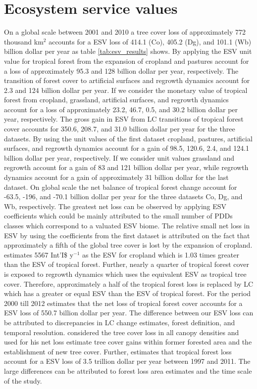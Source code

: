 	\section{Ecosystem service values}
		On a global scale between 2001 and 2010 a tree cover loss of approximately 772 thousand km$^2$ accounts for a \ac{ESV} loss of 414.1 (Co), 405.2 (Dg), and 101.1 (Wb) billion dollar per year as table \ref{tab:esv_results} shows. By applying the \ac{ESV} unit value for tropical forest from \citet{Costanza2014} the expansion of cropland and pastures account for a loss of approximately 95.3 and 128 billion dollar per year, respectively. The transition of forest cover to artificial surfaces and regrowth dynamics account for 2.3 and 124 billion dollar per year. If we consider the monetary value of tropical forest from \citet{Siikamaki2015} cropland, grassland, artificial surfaces, and regrowth dynamics account for a loss of approximately 23.2, 46.7, 0.5, and 30.2 billion dollar per year, respectively. The gross gain in \ac{ESV} from \ac{LC} transitions of tropical forest cover accounts for 350.6, 208.7, and 31.0 billion dollar per year for the three datasets. By using the unit values of the first dataset cropland, pastures, artificial surfaces, and regrowth dynamics account for a gain of 98.5, 120.6, 2.4, and 124.1 billion dollar per year, respectively. If we consider \citet{Groot2012} unit values grassland and regrowth account for a gain of 83 and 121 billion dollar per year, while regrowth dynamics account for a gain of approximately 31 billion dollar for the last dataset. On global scale the net balance of tropical forest change account for -63.5, -196, and -70.1 billion dollar per year for the three datasets Co, Dg, and Wb, respectively. The greatest net loss can be observed by applying \citet{Groot2012} \ac{ESV} coefficients which could be mainly attributed to the small number of \acp{PDD} classes which correspond to a valuated \ac{ESV} biome. The relative small net loss in \ac{ESV} by using the coefficients from the first dataset is attributed on the fact that approximately a fifth of the global tree cover is lost by the expansion of cropland. \citet{Costanza2014} estimates 5567 Int'I\$ y$^{-1}$ as the \ac{ESV} for cropland which is 1.03 times greater than the \ac{ESV} of tropical forest. Further, nearly a quarter of tropical forest cover is exposed to regrowth dynamics which uses the equivalent \ac{ESV} as tropical tree cover. Therefore, approximately a half of the tropical forest loss is replaced by \ac{LC} which has a greater or equal \ac{ESV} than the \ac{ESV} of tropical forest. For the period 2000 till 2012 \citet{Song2018} estimates that the net loss of tropical forest cover accounts for a \ac{ESV} loss of 550.7 billion dollar per year. The difference between our \ac{ESV} loss can be attributed to discrepancies in \ac{LC} change estimates, forest definition, and temporal resolution. \citet{Song2018} considered the tree cover loss in all canopy densities and used for his net loss estimate tree cover gains within former forested area and the establishment of new tree cover. Further, \citet{Costanza2014} estimates that tropical forest loss account for a \ac{ESV} loss of 3.5 trillion dollar per year between 1997 and 2011. The large differences can be attributed to forest loss area estimates and the time scale of the study.
